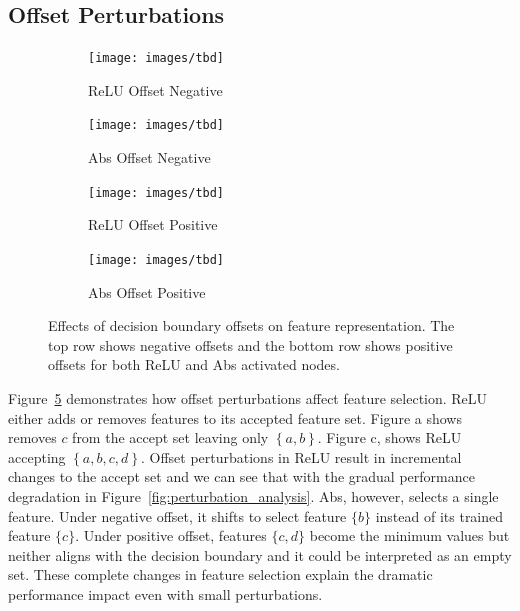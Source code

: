\subsection{Offset Perturbations}

\begin{figure}[t]
    \centering

    \begin{subfigure}[b]{0.49\textwidth}
        \centering
        \texttt{[image: images/tbd]}
        \caption{ReLU Offset Negative}
        \label{fig:relu_offset_down}
    \end{subfigure}
    \hfill
    \begin{subfigure}[b]{0.49\textwidth}
        \centering
        \texttt{[image: images/tbd]}
        \caption{Abs Offset Negative}
        \label{fig:abs_offset_down}
    \end{subfigure}

    \begin{subfigure}[b]{0.49\textwidth}
    \centering
    \texttt{[image: images/tbd]}
    \caption{ReLU Offset Positive}
    \label{fig:relu_offset_up}
    \end{subfigure}
    \hfill
    \begin{subfigure}[b]{0.49\textwidth}
    \centering
    \texttt{[image: images/tbd]}
    \caption{Abs Offset Positive}
    \label{fig:abs_offset_up}
    \end{subfigure}

    \caption{Effects of decision boundary offsets on feature representation. The top row shows negative offsets  and the bottom row shows positive offsets for both ReLU and Abs activated nodes.}
    \label{fig:offset_demo}
\end{figure}

Figure~\ref{fig:offset_demo} demonstrates how offset perturbations affect feature selection. ReLU either adds or removes features to its accepted feature set. Figure a shows removes $c$ from the accept set leaving only $\left\{ a, b \right\}$. Figure c, shows ReLU accepting $\left\{ a, b, c, d \right\}$. Offset perturbations in ReLU result in incremental changes to the accept set and we can see that with the gradual performance degradation in Figure~\ref{fig:perturbation_analysis}. Abs, however, selects a single feature. Under negative offset, it shifts to select feature $\{b\}$ instead of its trained feature $\{c\}$. Under positive offset, features $\{c,d\}$ become the minimum values but neither aligns with the decision boundary and it could be interpreted as an empty set. These complete changes in feature selection explain the dramatic performance impact even with small perturbations.

